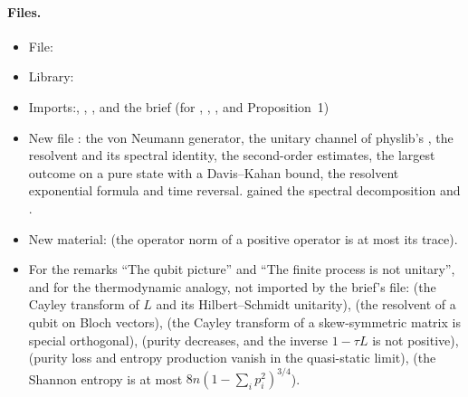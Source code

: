 \documentclass[11pt]{article}
\begin{document}
\paragraph{Files.}\leavevmode
\begin{itemize}
\item File: 
\item Library: 
\item Imports:\newline {},\newline
  ,\newline
  ,\newline
  and the brief  (for , , ,
   and Proposition~1)
\item New file : the von Neumann
  generator, the unitary channel of physlib's , the resolvent and
  its spectral identity, the second-order estimates, the largest outcome on a pure state with a
  Davis--Kahan bound, the resolvent exponential formula and time reversal.  gained
  the spectral decomposition  and .
\item New  material:\newline
   (the operator norm of a positive
  operator is at most its trace).
\item For the remarks ``The qubit picture'' and ``The finite process is not unitary'', and for
  the thermodynamic analogy, not imported by the brief's file:\newline
   (the Cayley transform of
  $L$ and its Hilbert--Schmidt unitarity),\newline
   (the resolvent of a qubit on
  Bloch vectors),\newline
   (the Cayley transform of a skew-symmetric
  matrix is special orthogonal),\newline
   (purity decreases,
  and the inverse $1 - \tau L$ is not positive),\newline
   (purity loss and
  entropy production vanish in the quasi-static limit),\newline
   (the Shannon entropy is at most
  $8n(1 - \sum_i p_i^2)^{3/4}$).
\end{itemize}
\end{document}

